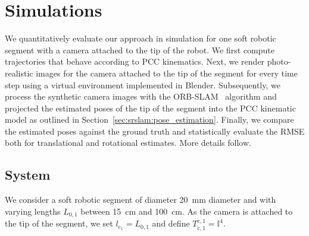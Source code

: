 \section{Simulations}
\label{sec:srslam:simulations}

We quantitatively evaluate our approach in simulation for one soft robotic segment with a camera attached to the tip of the robot. 
We first compute trajectories that behave according to \gls{PCC} kinematics. 
Next, we render photo-realistic images for the camera attached to the tip of the segment for every time step using a virtual environment implemented in Blender. Subsequently, we process the synthetic camera images with the ORB-SLAM~\citep{mur2017orb} algorithm and projected the estimated poses of the tip of the segment into the \gls{PCC} kinematic model as outlined in Section~\ref{sec:srslam:pose_estimation}. Finally, we compare the estimated poses against the ground truth and statistically evaluate the \gls{RMSE} both for translational and rotational estimates. More details follow.

\subsection{System}\label{sub:srslam:simulations_system}
We consider a soft robotic segment of diameter \SI{20}{mm} diameter and with varying lengths $L_{0,1}$ between \SI{15}{cm} and \SI{100}{cm}.
As the camera is attached to the tip of the segment, we set $l_{\mathrm{c}_1} = L_{0,1}$ and define $T_{\check{\mathrm{c}},1}^{\mathrm{c},1} = \mathbb{I}^4$.

